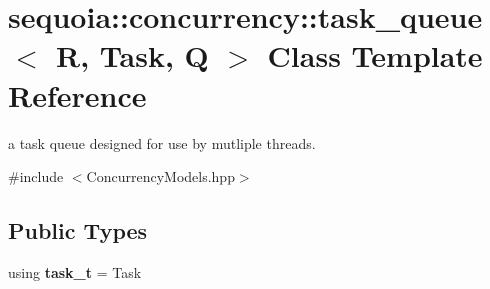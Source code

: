 \hypertarget{classsequoia_1_1concurrency_1_1task__queue}{}\section{sequoia\+::concurrency\+::task\+\_\+queue$<$ R, Task, Q $>$ Class Template Reference}
\label{classsequoia_1_1concurrency_1_1task__queue}


a task queue designed for use by mutliple threads.  




{\ttfamily \#include $<$Concurrency\+Models.\+hpp$>$}

\subsection*{Public Types}
\begin{DoxyCompactItemize}
\item 
\mbox{\label{classsequoia_1_1concurrency_1_1task__queue_a5ac7a443fcbc5c745ba506951717006e}} 
using {\bfseries task\+\_\+t} = Task
\end{DoxyCompactItemize}
